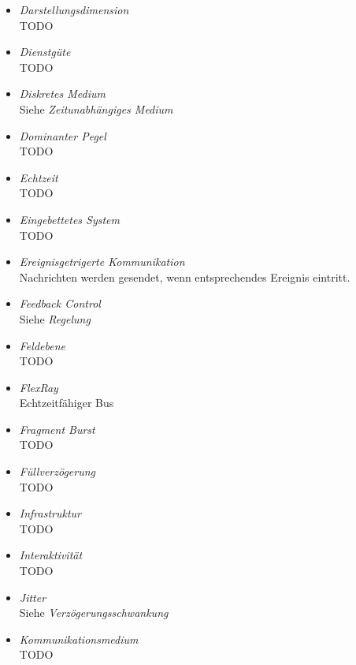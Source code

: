 \documentclass{article}
\begin{document}
\begin{itemize}
	\item \emph{Darstellungsdimension}\\
		TODO

	\item \emph{Dienstgüte}\\
		TODO

	\item \emph{Diskretes Medium}\\
		Siehe \emph{Zeitunabhängiges Medium}

	\item \emph{Dominanter Pegel}\\
		TODO

	\item \emph{Echtzeit}\\
		TODO

	\item \emph{Eingebettetes System}\\
		TODO

	\item \emph{Ereignisgetrigerte Kommunikation}\\
		Nachrichten werden gesendet, wenn entsprechendes Ereignis eintritt.

	\item \emph{Feedback Control}\\
		Siehe \emph{Regelung}

	\item \emph{Feldebene}\\
		TODO

	\item \emph{FlexRay}\\
		Echtzeitfähiger Bus

	\item \emph{Fragment Burst}\\
		TODO

	\item \emph{Füllverzögerung}\\
		TODO

	\item \emph{Infrastruktur}\\
		TODO

	\item \emph{Interaktivität}\\
		TODO

	\item \emph{Jitter}\\
		Siehe \emph{Verzögerungsschwankung}

	\item \emph{Kommunikationsmedium}\\
		TODO


\end{itemize}
\end{document}
